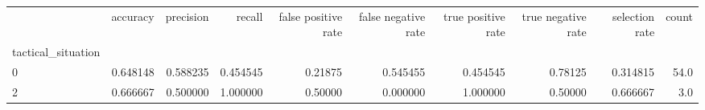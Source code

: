 \begin{tabular}{lrrrrrrrrr}
\toprule
{} &  accuracy &  precision &    recall &  false positive rate &  false negative rate &  true positive rate &  true negative rate &  selection rate &  count \\
tactical\_situation &           &            &           &                      &                      &                     &                     &                 &        \\
\midrule
0                  &  0.648148 &   0.588235 &  0.454545 &              0.21875 &             0.545455 &            0.454545 &             0.78125 &        0.314815 &   54.0 \\
2                  &  0.666667 &   0.500000 &  1.000000 &              0.50000 &             0.000000 &            1.000000 &             0.50000 &        0.666667 &    3.0 \\
\bottomrule
\end{tabular}
